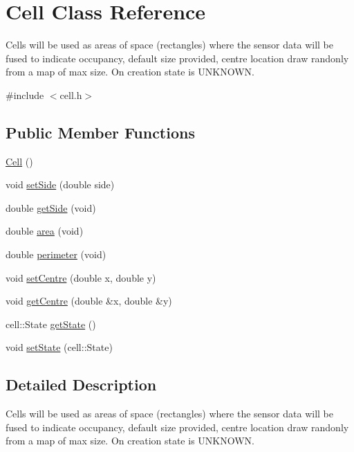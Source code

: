 \hypertarget{class_cell}{}\section{Cell Class Reference}
\label{class_cell}


Cells will be used as areas of space (rectangles) where the sensor data will be fused to indicate occupancy, default size provided, centre location draw randonly from a map of max size. On creation state is U\+N\+K\+N\+O\+WN.  




{\ttfamily \#include $<$cell.\+h$>$}

\subsection*{Public Member Functions}
\begin{DoxyCompactItemize}
\item 
\hyperlink{class_cell_a394510643e8664cf12b5efaf5cb99f71}{Cell} ()
\item 
void \hyperlink{class_cell_a9c4fd400ffbf61fe18073f3b244614ab}{set\+Side} (double side)
\item 
double \hyperlink{class_cell_a8369e6773b462215ea3c13d216621cb7}{get\+Side} (void)
\item 
double \hyperlink{class_cell_ad4fa31d97490fac2a1d11f3afaea4e67}{area} (void)
\item 
double \hyperlink{class_cell_af02495b8e758ee82478134fd491f3e13}{perimeter} (void)
\item 
void \hyperlink{class_cell_a882f75366d9cf6477d1fd7f9dd54519b}{set\+Centre} (double x, double y)
\item 
void \hyperlink{class_cell_a1087822ba50d7afea999824cca8cc1f4}{get\+Centre} (double \&x, double \&y)
\item 
cell\+::\+State \hyperlink{class_cell_aba131004c3f0bade13ef1b72e5694885}{get\+State} ()
\item 
void \hyperlink{class_cell_adeb7a033171fa07557e756f3fcc4717d}{set\+State} (cell\+::\+State)
\end{DoxyCompactItemize}


\subsection{Detailed Description}
Cells will be used as areas of space (rectangles) where the sensor data will be fused to indicate occupancy, default size provided, centre location draw randonly from a map of max size. On creation state is U\+N\+K\+N\+O\+WN. 

